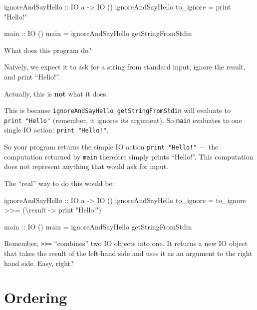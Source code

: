 \documentclass[]{article}
\newenvironment{Shaded}{}{}
\newcommand{\DataTypeTok}[1]{\textcolor[rgb]{0.56,0.13,0.00}{#1}}
\newcommand{\FunctionTok}[1]{\textcolor[rgb]{0.02,0.16,0.49}{#1}}
\newcommand{\NormalTok}[1]{#1}
\newcommand{\OtherTok}[1]{\textcolor[rgb]{0.00,0.44,0.13}{#1}}
\newcommand{\StringTok}[1]{\textcolor[rgb]{0.25,0.44,0.63}{#1}}
\begin{document}
\begin{Shaded}
\begin{Highlighting}[]
\OtherTok{ignoreAndSayHello ::} \DataTypeTok{IO}\NormalTok{ a }\OtherTok{->} \DataTypeTok{IO}\NormalTok{ ()}
\NormalTok{ignoreAndSayHello to_ignore }\FunctionTok{=}\NormalTok{ print }\StringTok{"Hello!"}

\OtherTok{main ::} \DataTypeTok{IO}\NormalTok{ ()}
\NormalTok{main }\FunctionTok{=}\NormalTok{ ignoreAndSayHello getStringFromStdin}
\end{Highlighting}
\end{Shaded}

What does this program do?

Naively, we expect it to ask for a string from standard input, ignore the
result, and print ``Hello!''.

Actually, this is \textbf{not} what it does.

This is because \texttt{ignoreAndSayHello\ getStringFromStdin} will evaluate to
\texttt{print\ "Hello"} (remember, it ignores its argument). So \texttt{main}
evaluates to one single IO action: \texttt{print\ "Hello!"}.

So your program returns the simple IO action \texttt{print\ "Hello!"} --- the
computation returned by \texttt{main} therefore simply prints ``Hello!''. This
computation does not represent anything that would ask for input.

The ``real'' way to do this would be:

\begin{Shaded}
\begin{Highlighting}[]
\OtherTok{ignoreAndSayHello ::} \DataTypeTok{IO}\NormalTok{ a }\OtherTok{->} \DataTypeTok{IO}\NormalTok{ ()}
\NormalTok{ignoreAndSayHello to_ignore }\FunctionTok{=}\NormalTok{ to_ignore }\FunctionTok{>>=}\NormalTok{ (\textbackslash{}result }\OtherTok{->}\NormalTok{ print }\StringTok{"Hello!"}\NormalTok{)}

\OtherTok{main ::} \DataTypeTok{IO}\NormalTok{ ()}
\NormalTok{main }\FunctionTok{=}\NormalTok{ ignoreAndSayHello getStringFromStdin}
\end{Highlighting}
\end{Shaded}

Remember, \texttt{\textgreater{}\textgreater{}=} ``combines'' two IO objects
into one. It returns a new IO object that takes the result of the left-hand side
and uses it as an argument to the right hand side. Easy, right?

\hypertarget{ordering}{%
\section{Ordering}\label{ordering}}
\end{document}
